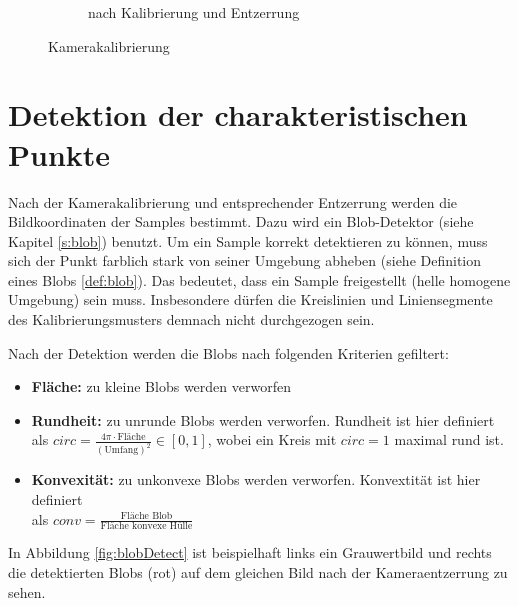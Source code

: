 \begin{figure}[!htb]
\begin{subfigure}{.5\textwidth}
	\caption{nach Kalibrierung und Entzerrung}
	\label{fig:calibUndist}
\end{subfigure}
\caption{Kamerakalibrierung}
\label{fig:calib}
\end{figure}

\section{Detektion der charakteristischen Punkte}

Nach der Kamerakalibrierung und entsprechender Entzerrung werden die Bildkoordinaten der Samples bestimmt. Dazu wird ein Blob-Detektor (siehe Kapitel \ref{s:blob}) benutzt.
Um ein Sample korrekt detektieren zu können, muss sich der Punkt farblich stark von seiner Umgebung abheben (siehe Definition eines Blobs \ref{def:blob}). Das bedeutet, dass ein Sample freigestellt (helle homogene Umgebung) sein muss. Insbesondere dürfen die Kreislinien und Liniensegmente des Kalibrierungsmusters demnach nicht durchgezogen sein.

Nach der Detektion werden die Blobs nach folgenden Kriterien gefiltert:

\begin{itemize}
	\item \textbf{Fläche:} zu kleine Blobs werden verworfen
	\item \textbf{Rundheit:} zu unrunde Blobs werden verworfen. Rundheit ist hier definiert als $circ = \frac{4\pi\cdot \textrm{Fläche}}{\left(\textrm{Umfang}\right)^2}\in[0,1]$, wobei ein Kreis mit $circ = 1$ maximal rund ist.
	\item  \textbf{Konvexität:} zu unkonvexe Blobs werden verworfen. Konvextität ist hier definiert \\als $conv = \frac{\textrm{Fläche Blob}}{\textrm{Fläche konvexe Hülle}}$
\end{itemize}

In Abbildung \ref{fig:blobDetect} ist beispielhaft links ein Grauwertbild und rechts die detektierten Blobs (rot) auf dem gleichen Bild nach der Kameraentzerrung zu sehen.


